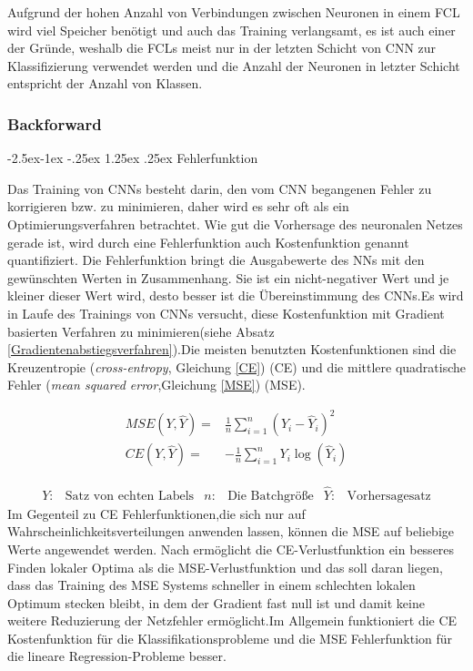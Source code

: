 \documentclass[12pt,a4paper]{scrartcl}
\makeatletter
\numberwithin{equation}{section}
\renewcommand\paragraph{\@startsection{paragraph}{4}{\z@}%
	{-2.5ex\@plus -1ex \@minus -.25ex}%
	{1.25ex \@plus .25ex}%
	{\normalfont\normalsize\bfseries}}
\makeatother
\begin{document}
Aufgrund der hohen Anzahl von Verbindungen zwischen Neuronen in einem {FCL} wird viel Speicher benötigt und auch das Training verlangsamt, es ist auch einer der Gründe, weshalb die {FCLs} meist nur in der letzten Schicht von {CNN} zur Klassifizierung verwendet werden und die Anzahl der Neuronen in letzter Schicht entspricht der Anzahl von Klassen.



\subsubsection{Backforward }

\paragraph{Fehlerfunktion}\label{Fehlerfunktion}

Das Training von \acsp{CNN} besteht darin, den vom {CNN} begangenen Fehler zu korrigieren bzw. zu minimieren, daher wird es sehr oft als ein Optimierungsverfahren betrachtet.
Wie gut die Vorhersage des neuronalen Netzes gerade ist, wird durch eine Fehlerfunktion auch Kostenfunktion genannt quantifiziert.
Die Fehlerfunktion bringt die Ausgabewerte des \acsp{NN} mit den gewünschten Werten in Zusammenhang. Sie ist ein nicht-negativer Wert und je kleiner dieser Wert wird, desto besser ist die Übereinstimmung des {CNNs}.Es wird in Laufe des Trainings von {CNNs} versucht, diese Kostenfunktion mit Gradient basierten Verfahren zu minimieren(siehe Absatz \ref{Gradientenabstiegsverfahren}).Die meisten benutzten Kostenfunktionen sind die Kreuzentropie (\textit{cross-entropy}, Gleichung \ref{CE}) (CE) und die mittlere quadratische Fehler (\textit{mean squared error},Gleichung \ref{MSE}) (MSE). 

\begin{align}
\label{MSE}	
MSE(Y, \widehat{Y}) =&\frac{1}{n}\sum_{i = 1}^{n}(Y_i - \widehat{Y}_i)^2\\
\label{CE}
CE(Y, \widehat{Y}) =&-\frac{1}{n}\sum_{i = 1}^{n}Y_i\log(\widehat{Y}_i) 
\end{align}

\begin{align*}
Y:&\text{Satz von echten Labels} &  n: & \text{Die Batchgröße} & \widehat{Y}:&\text{Vorhersagesatz} 
\end{align*}
Im Gegenteil zu CE Fehlerfunktionen,die sich nur auf Wahrscheinlichkeitsverteilungen anwenden lassen, können die MSE auf beliebige Werte angewendet werden. Nach \cite[Pavel et al]{7} ermöglicht die CE-Verlustfunktion ein besseres Finden lokaler Optima als die MSE-Verlustfunktion und das soll daran liegen, dass das Training des MSE Systems schneller in einem schlechten lokalen Optimum stecken bleibt, in dem der Gradient fast null ist und damit keine weitere Reduzierung der Netzfehler ermöglicht.Im Allgemein funktioniert die CE Kostenfunktion für die Klassifikationsprobleme und die MSE Fehlerfunktion für die lineare Regression-Probleme besser.
\end{document}
